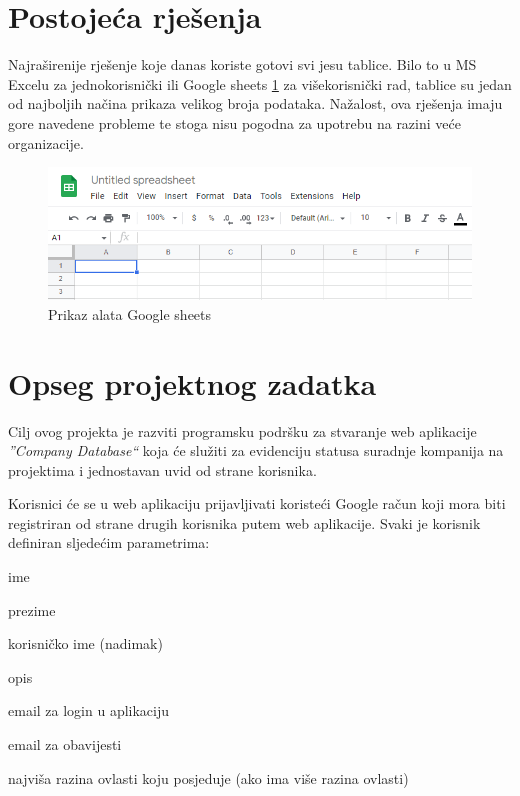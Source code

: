 		\section{Postojeća rješenja}
		
		{Najraširenije rješenje koje danas koriste gotovi svi jesu tablice. Bilo to u MS Excelu za jednokorisnički ili Google sheets \ref{fig:GoogleSheets} za višekorisnički rad, tablice su jedan od najboljih načina prikaza velikog broja podataka. Nažalost, ova rješenja imaju gore navedene probleme te stoga nisu pogodna za upotrebu na razini veće organizacije.}
		
		\begin{figure}[H]
			\includegraphics[width=\textwidth]{slike/GoogleSheets.png} %
			\caption{Prikaz alata Google sheets}
			\label{fig:GoogleSheets} %
		\end{figure}
		
		\section{Opseg projektnog zadatka}

		{Cilj ovog projekta je razviti programsku podršku za stvaranje web aplikacije \textit{”Company Database“} koja će služiti za evidenciju statusa suradnje kompanija na projektima i jednostavan uvid od strane  korisnika.}\vspace{0.2cm}
		
		{Korisnici će se u web aplikaciju prijavljivati koristeći Google račun koji mora biti registriran od strane drugih korisnika putem web aplikacije. Svaki je korisnik definiran sljedećim parametrima:}
		\begin{packed_item}
			\item {ime}
			\item {prezime}
			\item {korisničko ime} (nadimak)
			\item {opis}
			\item {email za login u aplikaciju}
			\item {email za obavijesti}
			\item {najviša razina ovlasti koju posjeduje (ako ima više razina ovlasti)}
		\end{packed_item}
		
